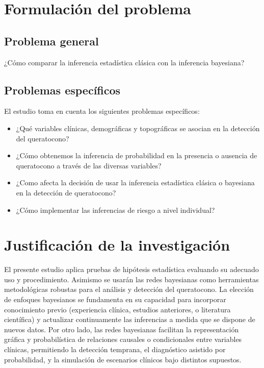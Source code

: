 \section{Formulación del problema}
\subsection{Problema general}
¿Cómo comparar la inferencia estadística clásica con la inferencia bayesiana?

\subsection{Problemas específicos}
El estudio toma en cuenta los siguientes problemas específicos:

\begin{itemize}
	\item ¿Qué variables clínicas, demográficas y topográficas se asocian en la detección del queratocono?
	\item ¿Cómo obtenemos la inferencia de probabilidad en la presencia o ausencia de queratocono a través de las diversas variables?
	\item ¿Como afecta la decisión de usar la inferencia estadística clásica o bayesiana en la detección de queratocono?
	\item ¿Cómo implementar las inferencias de riesgo a nivel individual?
\end{itemize}

\section{Justificación de la investigación}
El presente estudio aplica pruebas de hipótesis estadística evaluando su adecuado uso y procedimiento. Asimismo se usarán las redes bayesianas como herramientas metodológicas robustas para el análisis y detección del queratocono. La elección de enfoques bayesianos se fundamenta en su capacidad para incorporar conocimiento previo (experiencia clínica, estudios anteriores, o literatura científica) y actualizar continuamente las inferencias a medida que se dispone de nuevos datos. Por otro lado, las redes bayesianas facilitan la representación gráfica y probabilística de relaciones causales o condicionales entre variables clínicas, permitiendo la detección temprana, el diagnóstico asistido por probabilidad, y la simulación de escenarios clínicos bajo distintos supuestos.

